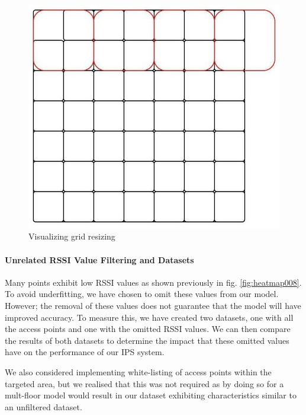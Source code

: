 \documentclass[runningheads]{llncs}
\begin{document}
\begin{figure}[htbp]
	\centerline{\includegraphics[scale=0.5]{image14.jpg}}
	\caption{Visualizing grid resizing}
	\label{fig:vis_grid_resize}
\end{figure}

\paragraph{Unrelated RSSI Value Filtering and Datasets} Many points exhibit low RSSI values as shown previously in fig. \ref{fig:heatmap008}. To avoid underfitting, we have chosen to omit these values from our model. However; the removal of these values does not guarantee that the model will have improved accuracy. To measure this, we have created two datasets, one with all the access points and one with the omitted RSSI values. We can then compare the results of both datasets to determine the impact that these omitted values have on the performance of our IPS system.

We also considered implementing white-listing of access points within the targeted area, but we realised that this was not required as by doing so for a mult-floor model would result in our dataset exhibiting characteristics similar to an unfiltered dataset.
\end{document}
